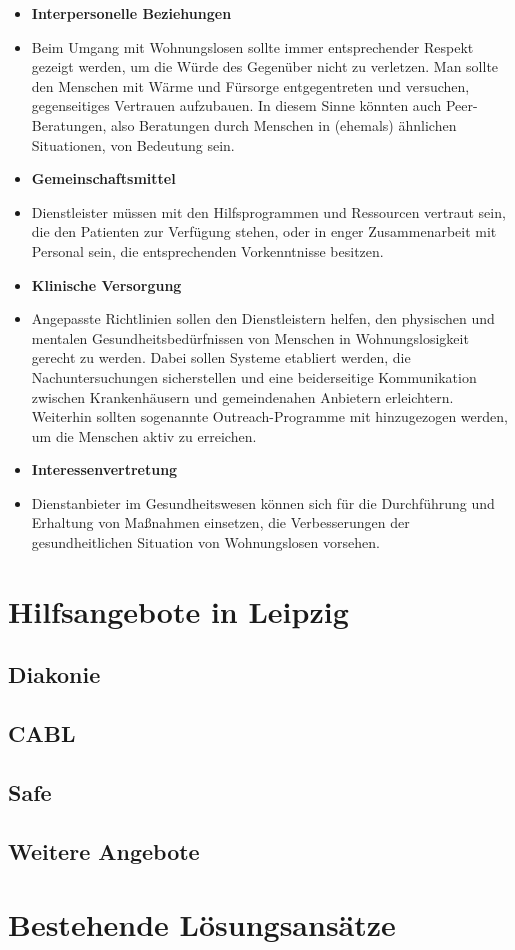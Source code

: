 \begin{itemize}
	\item \textbf{Interpersonelle Beziehungen}
	\item[] Beim Umgang mit Wohnungslosen sollte immer entsprechender Respekt gezeigt werden, um die Würde des Gegenüber nicht zu verletzen. Man sollte den Menschen mit Wärme und Fürsorge entgegentreten und versuchen, gegenseitiges Vertrauen aufzubauen. In diesem Sinne könnten auch Peer-Beratungen, also Beratungen durch Menschen in (ehemals) ähnlichen Situationen, von Bedeutung sein.
	\item \textbf{Gemeinschaftsmittel}
	\item[] Dienstleister müssen mit den Hilfsprogrammen und Ressourcen vertraut sein, die den Patienten zur Verfügung stehen, oder in enger Zusammenarbeit mit Personal sein, die entsprechenden Vorkenntnisse besitzen. \newpage
	\item \textbf{Klinische Versorgung}
	\item[] Angepasste Richtlinien sollen den Dienstleistern helfen, den physischen und mentalen Gesundheitsbedürfnissen von Menschen in Wohnungslosigkeit gerecht zu werden. Dabei sollen Systeme etabliert werden, die Nachuntersuchungen sicherstellen und eine beiderseitige Kommunikation zwischen Krankenhäusern und gemeindenahen Anbietern erleichtern. Weiterhin sollten sogenannte Outreach-Programme mit hinzugezogen werden, um die Menschen aktiv zu erreichen.
	\item \textbf{Interessenvertretung}
	\item[] Dienstanbieter im Gesundheitswesen können sich für die Durchführung und Erhaltung von Maßnahmen einsetzen, die Verbesserungen der gesundheitlichen Situation von Wohnungslosen vorsehen.
\end{itemize}


\section{Hilfsangebote in Leipzig}


\subsection{Diakonie}

\subsection{CABL}

\subsection{Safe}

\subsection{Weitere Angebote}


\section{Bestehende Lösungsansätze}

